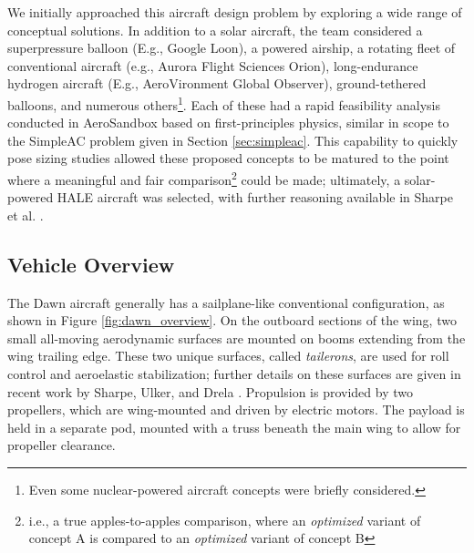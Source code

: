 We initially approached this aircraft design problem by exploring a wide range of conceptual solutions. In addition to a solar aircraft, the team considered a superpressure balloon (E.g., Google Loon), a powered airship, a rotating fleet of conventional aircraft (e.g., Aurora Flight Sciences Orion), long-endurance hydrogen aircraft (E.g., AeroVironment Global Observer), ground-tethered balloons, and numerous others\footnote{Even some nuclear-powered aircraft concepts were briefly considered.}. Each of these had a rapid feasibility analysis conducted in AeroSandbox based on first-principles physics, similar in scope to the SimpleAC problem given in Section \ref{sec:simpleac}. This capability to quickly pose sizing studies allowed these proposed concepts to be matured to the point where a meaningful and fair comparison\footnote{i.e., a true apples-to-apples comparison, where an \emph{optimized} variant of concept A is compared to an \emph{optimized} variant of concept B} could be made; ultimately, a solar-powered HALE aircraft was selected, with further reasoning available in Sharpe et al. \cite{sharpe_optimization_2021}.

\subsection{Vehicle Overview}

The Dawn aircraft generally has a sailplane-like conventional configuration, as shown in Figure \ref{fig:dawn_overview}. On the outboard sections of the wing, two small all-moving aerodynamic surfaces are mounted on booms extending from the wing trailing edge. These two unique surfaces, called \emph{tailerons}, are used for roll control and aeroelastic stabilization; further details on these surfaces are given in recent work by Sharpe, Ulker, and Drela \cite{sharpe_tailerons_2023}. Propulsion is provided by two propellers, which are wing-mounted and driven by electric motors. The payload is held in a separate pod, mounted with a truss beneath the main wing to allow for propeller clearance.

